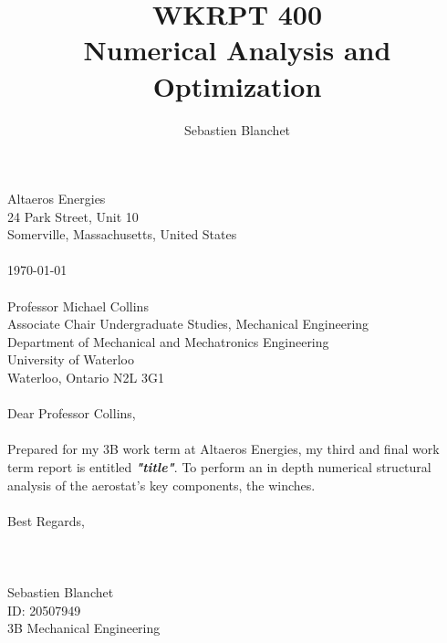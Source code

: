 
\title[WKRPT 400]{WKRPT 400\\Numerical Analysis and Optimization}%
\author{Sebastien Blanchet}
\maketitle
\begin{declaration}
    \noindent
	Altaeros Energies\\
	24 Park Street, Unit 10\\
	Somerville, Massachusetts, United States\\
	\\  
    \noindent  	
    \today \\
  	\\  
    \noindent
    Professor Michael Collins\\
	Associate Chair Undergraduate Studies, Mechanical Engineering\\
	Department of Mechanical and Mechatronics Engineering\\
	University of Waterloo\\
	Waterloo, Ontario N2L 3G1\\	
	\\
    \noindent
    Dear Professor Collins,\\
    \\
	\noindent
    Prepared for my 3B work term at Altaeros Energies, my third and final work term report is
	entitled \textbf{\emph{"title"}}. To perform an in depth numerical structural analysis of the aerostat's key components, the winches.\\
	\\
	\noindent	
	Best Regards,\\
	\\
	\\
	\\
	\noindent
	Sebastien Blanchet\\
	ID: 20507949\\
	3B Mechanical Engineering\\
	\\
	
\end{declaration}

